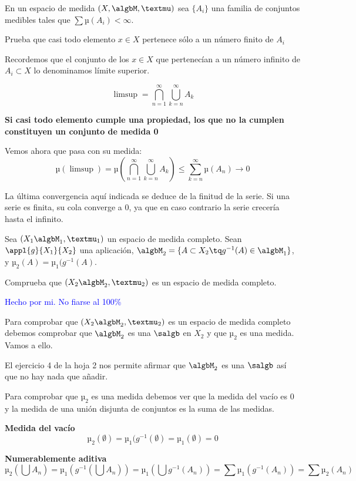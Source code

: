 \begin{problem}[10]
En un espacio de medida $(X, \algbM, µ)$ sea $\{A_i\}$ una familia de conjuntos medibles tales que $\sum µ(A_i) < \infty$.

Prueba que casi todo elemento $x \in X$ pertenece sólo a un número finito de $A_i$

\solution

Recordemos que el conjunto de los $x \in X$ que pertenecían a un número infinito de $A_i \subset X$ lo denominamos límite superior.

\[\limsup = \bigcap_{n=1}^{\infty}\bigcup_{k=n}^{\infty} A_k\]

\textbf{Si casi todo elemento cumple una propiedad, los que no la cumplen constituyen un conjunto de medida 0}

Vemos ahora que pasa con su medida:
\[µ(\limsup) = µ(\bigcap_{n=1}^{\infty}\bigcup_{k=n}^{\infty} A_k) \leq \sum_{k=n}^{\infty}µ(A_n) \rightarrow 0\]

La última convergencia aquí indicada se deduce de la finitud de la serie. Si una serie es finita, su cola converge a 0, ya que en caso contrario la serie crecería hasta el infinito.
\end{problem}

\begin{problem}[11]
Sea $(X_1 \algbM_1,µ_1)$ un espacio de medida completo. Sean $\appl{g}{X_1}{X_2}$ una aplicación, $\algbM_2=\{A \subset X_2 \tq g^{-1}(A) \in \algbM_1\}$, y $µ_2(A)=µ_1(g^{-1}(A)$.

Comprueba que $(X_2 \algbM_2,µ_2)$ es un espacio de medida completo.

\solution
\textcolor{blue}{Hecho por mi. No fiarse al 100\%}

Para comprobar que $(X_2 \algbM_2,µ_2)$ es un espacio de medida completo debemos comprobar que $\algbM_2$ es una $\salgb$ en $X_2$ y que $µ_2$ es una medida. Vamos a ello.

El ejercicio 4 de la hoja 2 nos permite afirmar que $\algbM_2$ es una $\salgb$ así que no hay nada que añadir.

Para comprobar que $µ_2$ es una medida debemos ver que la medida del vacío es 0 y la medida de una unión disjunta de conjuntos es la suma de las medidas.

\textbf{Medida del vacío}
\[µ_2(\emptyset) = µ_1(g^{-1}(\emptyset) = µ_1(\emptyset) = 0\]

\textbf{Numerablemente aditiva}
\[µ_2(\bigcup A_n) =  µ_1(g^{-1}(\bigcup A_n)) = µ_1(\bigcup g^{-1}(A_n)) = \sum µ_1(g^{-1}(A_n)) = \sum µ_2(A_n)\]
\end{problem}

